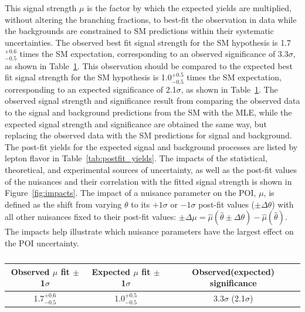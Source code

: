 This signal strength $\mu$ is the factor by which the expected \tth yields are multiplied, without altering the branching fractions, to best-fit the observation in data
while the backgrounds are constrained to SM predictions within their systematic uncertainties.
The observed  best fit signal strength for the SM \tth hypothesis is 1.7$^{+0.6}_{-0.5}$ times the SM expectation,
corresponding to an observed significance of 3.3$\sigma$, as shown in Table~\ref{tab:mu}.
This observation should be compared to the expected best fit signal strength for the SM \tth hypothesis is 1.0$^{+0.5}_{-0.5}$ times the SM expectation,
corresponding to an expected significance of 2.1$\sigma$, as shown in Table~\ref{tab:mu}.
The observed signal strength and significance result from comparing the observed data to the signal and background predictions from the SM with the MLE,
while the expected signal strength and significance are obtained the same way, but replacing the observed data with the SM predictions for signal and background.
The post-fit yields for the expected signal and background processes are listed by lepton flavor in Table~\ref{tab:postfit_yields}.
The impacts of the statistical, theoretical, and experimental sources of uncertainty, as well as the post-fit values of the nuisances and their correlation with
the fitted signal strength is shown in Figure~\ref{fig:impacts}. The impact of a nuisance parameter on the POI, $\mu$, is defined as the shift
from varying $\theta$ to its $+1\sigma$ or $-1\sigma$ post-fit values ($\pm\Delta\theta$) with all other nuisances fixed to their post-fit values:
$\pm\Delta\mu = \hat{\mu}(\hat{\theta}\pm\Delta\theta) -\hat{\mu}(\hat{\theta})$. The impacts help illustrate which nuisance parameters have the largest effect on
the POI uncertainty. 


\begin{table}[htbp]
\begin{center}
  \caption[Table of best-fit signal strength]{}
    \begin{tabular}{c c c} \hline
      Observed $\mu$ fit $\pm$1$\sigma$ & Expected $\mu$ fit $\pm$1$\sigma$ & Observed(expected) significance & \\ \hline 
      1.7$^{+0.6}_{-0.5}$ & 1.0$^{+0.5}_{-0.5}$ & 3.3$\sigma$ (2.1$\sigma$)  \\
      \hline
    \end{tabular}
    \label{tab:mu}
\end{center}
\end{table}


